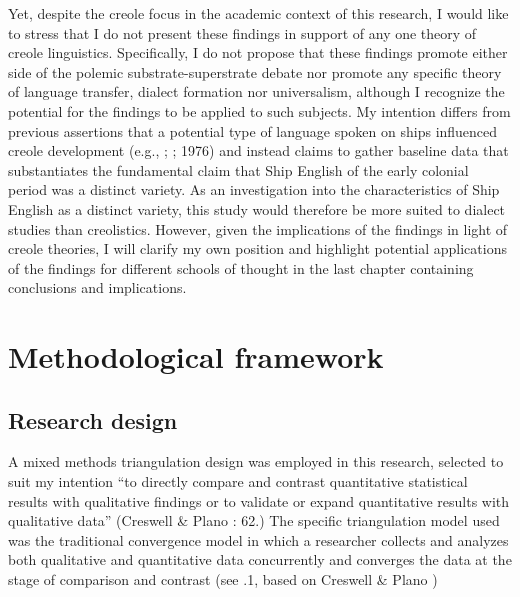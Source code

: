 Yet, despite the creole focus in the academic context of this research, I would like to stress that I do not present these findings in support of any one theory of creole linguistics. Specifically, I do not propose that these findings promote either side of the polemic substrate-superstrate debate nor promote any specific theory of language transfer, dialect formation nor universalism, although I recognize the potential for the findings to be applied to such subjects. My intention differs from previous assertions that a potential type of language spoken on ships influenced creole development (e.g., \citealt{Reinecke1938}; \citealt{Hancock1972}; 1976) and instead claims to gather baseline data that substantiates the fundamental claim that Ship English of the early colonial period was a distinct variety. As an investigation into the characteristics of Ship English as a distinct variety, this study would therefore be more suited to dialect studies than creolistics. However, given the implications of the findings in light of creole theories, I will clarify my own position and highlight potential applications of the findings for different schools of thought in the last chapter containing conclusions and implications. 



\section{\textbf{Methodological} \textbf{framework}}%



\subsection{\textbf{Research} \textbf{design}}%



A mixed methods triangulation design was employed in this research, selected to suit my intention “to directly compare and contrast quantitative statistical results with qualitative findings or to validate or expand quantitative results with qualitative data” (Creswell \& Plano \citealt{Clark2007}: 62.) The specific triangulation model used was the traditional convergence model in which a researcher collects and analyzes both qualitative and quantitative data concurrently and converges the data at the stage of comparison and contrast (see .1, based on Creswell \& Plano \citealt{Clark2007})


